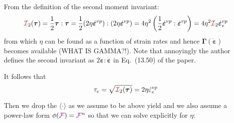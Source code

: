 
From the definition of the second moment invariant:
\[
{\III}_2(\bm\tau)
=\frac12 \bm\tau:\bm\tau 
=\frac12 (2\eta \dot{\bm \varepsilon}^{vp}):(2\eta \dot{\bm \varepsilon}^{vp})
=4 \eta^2   \left(\frac12 \dot{\bm \varepsilon}^{vp}: \dot{\bm \varepsilon}^{vp}\right)
=4\eta^2 {\III}_2  \dot{\bm \varepsilon}^{vp}_e
\]
from which $\eta$ can be found as a function of strain rates and 
hence $\bm\Gamma(\dot{\bm\varepsilon})$ becomes available (WHAT IS GAMMA?!).
Note that annoyingly the author defines the second invariant as 
$2 \dot{\bm\varepsilon}:\dot{\bm\varepsilon}$ in Eq.~(13.50) of the paper.

It follows that 
\[
\tau_e =\sqrt{{\III}_2(\bm\tau)}=2\eta \dot{\varepsilon}_e^{vp}
\]

Then we drop the $\langle \cdot \rangle$ as we assume to be above yield and 
we also assume a power-law form $\phi({\color{violet}\cal F})={\color{violet}\cal F}^n$ so that 
we can solve explicitly for $\eta$:

